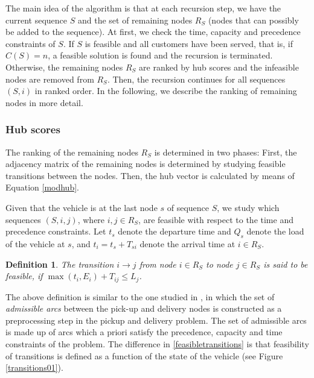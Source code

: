 \documentclass[dissertation,draft*]{aaltoseries}
\newtheorem*{definition}{Definition}
\begin{document}
The main idea of the algorithm is that at each recursion step, we have the current sequence $S$ 
and the set of remaining nodes $R_S$ (nodes that can possibly be added to the sequence). 
At first, we check the time, capacity and precedence constraints of $S$.
If $S$ is feasible and all customers have been served, that is, if $C(S) = n$, a feasible solution is found and 
the recursion is terminated.
Otherwise,
the remaining nodes $R_S$ are ranked by hub scores and the infeasible nodes 
are removed from $R_S$.
Then, the recursion continues for all sequences $(S,i)$ in ranked order.
In the following, we describe the ranking of remaining nodes in more detail.


\subsubsection{Hub scores}
\label{feasibility}
The ranking of the remaining nodes $R_S$ is determined in two phases: 
First, the adjacency matrix of the remaining nodes is determined by studying 
feasible transitions between the nodes.
Then, the hub vector is calculated by means of Equation \eqref{modhub}.

Given that the vehicle is at the last node $s$ of sequence $S$, we study which sequences $(S,i,j)$, where 
$i,j \in R_S$, are feasible with respect to the time and precedence constraints. %
Let $t_s$ denote the departure time and $Q_s$ denote the load of the vehicle at $s$, 
and $t_i = t_s + T_{si}$ denote the arrival time at $i \in R_S$. 
\begin{definition}
\label{feasibletransitions}
The transition 
$i \to j$ from node $i \in R_S$ to node $j \in R_S$ is said to be \emph{feasible}, if 
$\max(t_i, E_i) + T_{ij} \leq L_j$. 
\end{definition}
The above definition is similar to the one studied in \cite{dumas03}, 
in which the set of \emph{admissible arcs} between the pick-up and delivery nodes is constructed
as a preprocessing step in the pickup and delivery problem. The set of admissible arcs is 
made up of arcs which a priori satisfy the precedence, capacity and time constraints of the problem.
The difference in \eqref{feasibletransitions} is that feasibility of 
transitions is defined as a function of the state of the vehicle (see Figure \ref{transitions01}).
\end{document}
